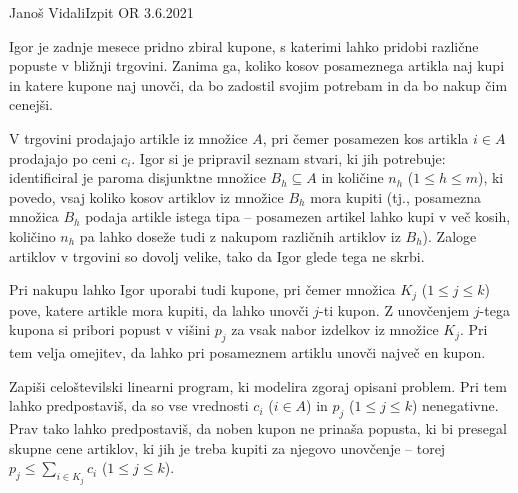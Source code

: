 \begin{naloga}{Janoš Vidali}{Izpit OR 3.6.2021}
\begin{vprasanje}
Igor je zadnje mesece pridno zbiral kupone,
s katerimi lahko pridobi različne popuste v bližnji trgovini.
Zanima ga, koliko kosov posameznega artikla naj kupi
in katere kupone naj unovči,
da bo zadostil svojim potrebam in da bo nakup čim cenejši.

V trgovini prodajajo artikle iz množice $A$,
pri čemer posamezen kos artikla $i \in A$ prodajajo po ceni $c_i$.
Igor si je pripravil seznam stvari, ki jih potrebuje:
identificiral je paroma disjunktne množice $B_h \subseteq A$
in količine $n_h$ ($1 \le h \le m$),
ki povedo, vsaj koliko kosov artiklov iz množice $B_h$ mora kupiti
(tj., posamezna množica $B_h$ podaja artikle istega tipa --
posamezen artikel lahko kupi v več kosih,
količino $n_h$ pa lahko doseže tudi z nakupom različnih artiklov iz $B_h$).
Zaloge artiklov v trgovini so dovolj velike, tako da Igor glede tega ne skrbi.

Pri nakupu lahko Igor uporabi tudi kupone,
pri čemer množica $K_j$ ($1 \le j \le k$) pove,
katere artikle mora kupiti, da lahko unovči $j$-ti kupon.
Z unovčenjem $j$-tega kupona si pribori popust v višini $p_j$
za vsak nabor izdelkov iz množice $K_j$.
Pri tem velja omejitev,
da lahko pri posameznem artiklu unovči največ en kupon.

Zapiši celoštevilski linearni program, ki modelira zgoraj opisani problem.
Pri tem lahko predpostaviš,
da so vse vrednosti $c_i$ ($i \in A$) in $p_j$ ($1 \le j \le k$) nenegativne.
Prav tako lahko predpostaviš,
da noben kupon ne prinaša popusta,
ki bi presegal skupne cene artiklov,
ki jih je treba kupiti za njegovo unovčenje
-- torej $p_j \le \sum_{i \in K_j} c_i$ ($1 \le j \le k$).
\end{vprasanje}


\end{naloga}
